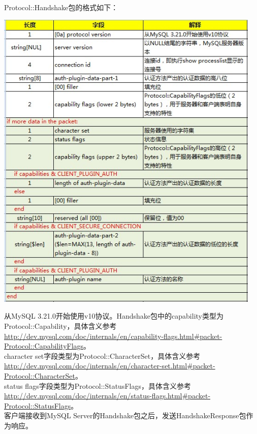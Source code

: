 \documentclass[a4paper, titlepage, 10pt, bookmark]{article}
\begin{document}
Protocol::Handshake包的格式如下：
\begin{center}
\includegraphics[width=5in]{009.jpg}
\end{center}

从MySQL 3.21.0开始使用v10协议。Handshake包中的capability类型为Protocol::Capability，具体含义参考\url{http://dev.mysql.com/doc/internals/en/capability-flags.html#packet-Protocol::CapabilityFlags}。\\

character set字段类型为Protocol::CharacterSet，具体含义参考\url{http://dev.mysql.com/doc/internals/en/character-set.html#packet-Protocol::CharacterSet}。\\

status flags字段类型为Protocol::StatusFlags，具体含义参考\url{http://dev.mysql.com/doc/internals/en/status-flags.html#packet-Protocol::StatusFlags}。\\

客户端接收到MySQL Server的Handshake包之后，发送HandshakeResponse包作为响应。
\end{document}
